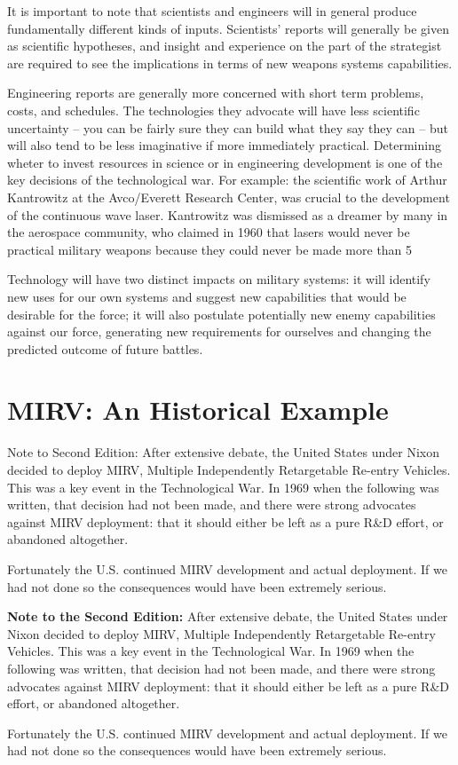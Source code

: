 It is important to note that scientists and engineers will in general produce fundamentally different kinds of inputs. Scientists' reports will generally be given as scientific hypotheses, and insight and experience on the part of the strategist are required to see the implications in terms of new weapons systems capabilities.

Engineering reports are generally more concerned with short term problems, costs, and schedules. The technologies they advocate will have less scientific uncertainty -- you can be fairly sure they can build what they say they can -- but will also tend to be less imaginative if more immediately practical. Determining wheter to invest resources in science or in engineering development is one of the key decisions of the technological war. For example: the scientific work of Arthur Kantrowitz at the Avco/Everett Research Center, was crucial to the development of the continuous wave laser. Kantrowitz was dismissed as a dreamer by many in the aerospace community, who claimed in 1960 that lasers would never be practical military weapons because they could never be made more than 5%

Technology will have two distinct impacts on military systems: it will identify new uses for our own systems and suggest new capabilities that would be desirable for the force; it will also postulate potentially new enemy capabilities against our force, generating new requirements for ourselves and changing the predicted outcome of future battles.

\section{MIRV: An Historical Example}

Note to Second Edition:
After extensive debate, the United States under Nixon decided to deploy MIRV, Multiple Independently Retargetable Re-entry Vehicles. This was a key event in the Technological War. In 1969 when the following was written, that decision had not been made, and there were strong advocates against MIRV deployment: that it should either be left as a pure R\&D effort, or abandoned altogether.

Fortunately the U.S. continued MIRV development and actual deployment. If we had not done so the consequences would have been extremely serious.

\begin{mdframed}[backgroundcolor=black!10]
\textbf{Note to the Second Edition:}
After extensive debate, the United States under Nixon decided to deploy MIRV, Multiple Independently Retargetable Re-entry Vehicles. This was a key event in the Technological War. In 1969 when the following was written, that decision had not been made, and there were strong advocates against MIRV deployment: that it should either be left as a pure R\&D effort, or abandoned altogether.

Fortunately the U.S. continued MIRV development and actual deployment. If we had not done so the consequences would have been extremely serious.
\end{mdframed}

